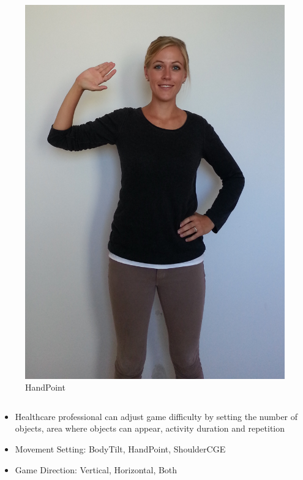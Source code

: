 \documentclass{beamer}
\begin{document}
\begin{frame}
\begin{columns}
\centering
\begin{figure}
\includegraphics[scale=0.06]{images/mia_handpoint.png}
\caption{HandPoint}
\end{figure}

\end{columns}
\begin{itemize}
\item Healthcare professional can adjust game difficulty by setting the number of objects, area where objects can appear, activity duration and repetition
\item Movement Setting: BodyTilt, HandPoint, ShoulderCGE
\item Game Direction: Vertical, Horizontal, Both
\end{itemize}
\end{frame}
\end{document}
